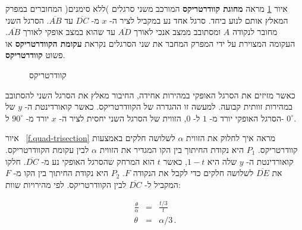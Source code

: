 איור
\ref{f.quad}
מראה
\textbf{מחוגת קוודרטריקס}
המורכב משני סרגלים )ללא סימנים( המחוברים במפרק המאלץ אותם לנוע ביחד. סרגל אחד נע במקביל לציר ה-%
$x$
מ-%
$\overline{DC}$
עד
$\overline{AB}$.
הסרגל השני מחובר לנקודה
$A$
ומסתובב ממצב אנכי לאורך 
$\overline{AD}$
עד שהוא במצב אופקי לאורך 
$\overline{AB}$. 
העקומה המצוירת על ידי המפרק המחבר את שני הסרגלים נקראת
\textbf{עקומת הקוודרטריקס}
או פשוט
\textbf{קוודרטריקס}.
\begin{figure}[bt]
\begin{center}

\end{center}
\caption{קוודרטריקס}\label{f.quad}
\end{figure}

כאשר מזיזים את הסרגל האופקי במהירות אחידה, החיבור מאלץ את הסרגל השני להסתובב במהירות זוותית קבועה. למעשה זו ההגדרה של הקוודרטריקס.
כאשר קואורדינטת ה-%
$y$
של הסרגל האופקי יורד מ-%
$1$
ל-%
$0$,
הזווית של הסרגל השני יחסית לציר ה-%
$x$
יורד מ-%
$90^\circ$
ל-%
$0^\circ$.

איור~%
\ref{f.quad-trisection}
מראה איך לחלוק את הזווית 
$\alpha$
לשלושה חלקים באמצעות קוודרטריקס.
$P_1$
היא נקודת החיתוך בין הקו המגדיר את הזווית 
$\alpha$
לבין עקומת הקוודרטריקס.
קואורדינטת ה-%
$y$
שלה היא
$1-t$,
כאשר 
$t$
הוא המרחק שהסרגל האופקי נע מ-%
$\overline{DC}$.
חלקו את
$\overline{DE}$
לשלושה חלקים כדי לקבל את הנקודה
$F$.
$P_2$
היא נקודת החיתוך בין הקו מ-%
$F$
המקביל ל-%
$\overline{DC}$
לבין הקוודרטריקס.
לפי מהירויות שוות:

\begin{eqnarray*}
\frac{\theta}{\alpha} &=& \frac{t/3}{t}\\
\theta &=& \alpha/3\,.
\end{eqnarray*}

